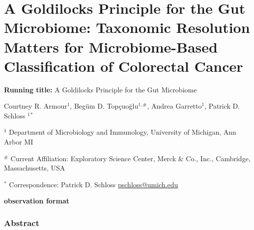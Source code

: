 \documentclass[
]{article}
\author{}
\date{\vspace{-2.5em}}
\begin{document}
\hypertarget{a-goldilocks-principle-for-the-gut-microbiome-taxonomic-resolution-matters-for-microbiome-based-classification-of-colorectal-cancer}{%
\section{A Goldilocks Principle for the Gut Microbiome: Taxonomic
Resolution Matters for Microbiome-Based Classification of Colorectal
Cancer}\label{a-goldilocks-principle-for-the-gut-microbiome-taxonomic-resolution-matters-for-microbiome-based-classification-of-colorectal-cancer}}

\vspace{10mm}

\textbf{Running title:} A Goldilocks Principle for the Gut Microbiome

\vspace{10mm}

Courtney R. Armour\({^1}\), Begüm D. Topçuoğlu\(^{1,\#}\), Andrea
Garretto\({^1}\), Patrick D. Schloss \({^1}\)\({^*}\)

\vspace{5mm}

\({^1}\) Department of Microbiology and Immunology, University of
Michigan, Ann Arbor MI

\({^\#}\) Current Affiliation: Exploratory Science Center, Merck \& Co.,
Inc., Cambridge, Massachusetts, USA~

\vspace{5mm}

\({^*}\) Correspondence: Patrick D. Schloss
\href{mailto:pschloss@umich.edu}{pschloss@umich.edu}

\vspace{20mm}

\textbf{observation format}

\newpage

\hypertarget{abstract}{%
\subsubsection{Abstract}\label{abstract}}
\end{document}
